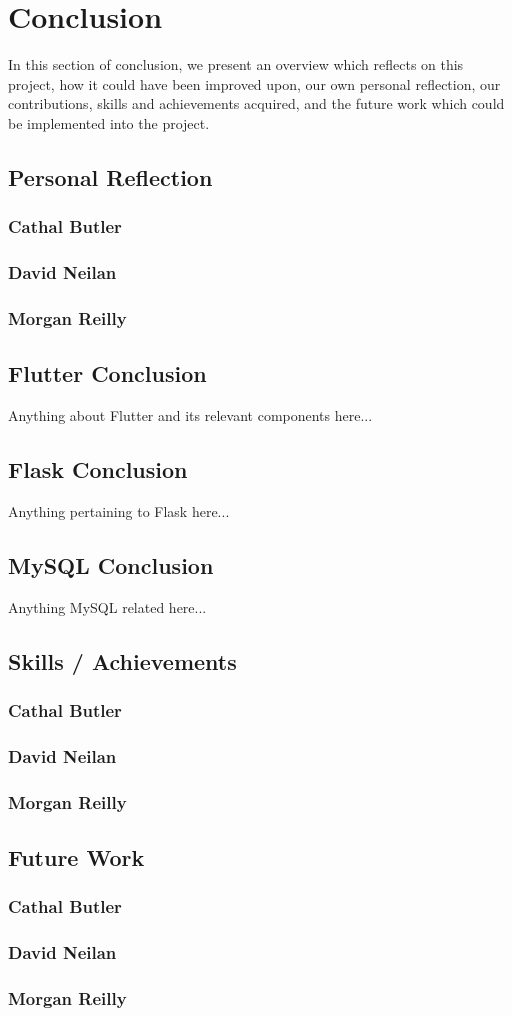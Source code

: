 \chapter{Conclusion}
In this section of conclusion, we present an overview which reflects on this project, how it could have been improved upon, our own personal reflection, our contributions, skills and achievements acquired, and the future work which could be implemented into the project.

\section{Personal Reflection}
\subsection{Cathal Butler}
\subsection{David Neilan}
\subsection{Morgan Reilly}

\section{Flutter Conclusion}
Anything about Flutter and its relevant components here...

\section{Flask Conclusion}
Anything pertaining to Flask here...

\section{MySQL Conclusion}
Anything MySQL related here...

\section{Skills / Achievements}
\subsection{Cathal Butler}
\subsection{David Neilan}
\subsection{Morgan Reilly}

\section{Future Work}
\subsection{Cathal Butler}
\subsection{David Neilan}
\subsection{Morgan Reilly}
